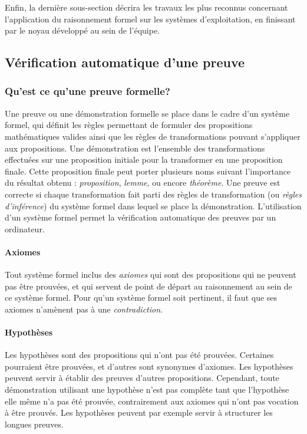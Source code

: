 	Enfin, la dernière sous-section décrira les travaux les plus reconnus concernant l'application du raisonnement formel sur les systèmes d'exploitation, en finissant par le noyau développé au sein de l'équipe.

		\subsection{Vérification automatique d'une preuve}

			\subsubsection{Qu'est ce qu'une preuve formelle?}
			Une preuve ou une démonstration formelle se place dans le cadre d'un système formel, qui définit les règles permettant de formuler des propositions mathématiques valides ainsi que les règles de transformations pouvant s'appliquer aux propositions. Une démonstration est l'ensemble des transformations effectuées sur une proposition initiale pour la transformer en une proposition finale. Cette proposition finale peut porter plusieurs noms suivant l'importance du résultat obtenu : \emph{proposition}, \emph{lemme}, ou encore \emph{théorème}. Une preuve est correcte si chaque transformation fait parti des règles de transformation (ou \emph{règles d'inférence}) du système formel dans lequel se place la démonstration. L'utilisation d'un système formel permet la vérification automatique des preuves par un ordinateur.

			\paragraph{Axiomes} Tout système formel inclus des \emph{axiomes} qui sont des propositions qui ne peuvent pas être prouvées, et qui servent de point de départ au raisonnement au sein de ce système formel. Pour qu'un système formel soit pertinent, il faut que ses axiomes n'amènent pas à une \emph{contradiction}.

			\paragraph{Hypothèses} Les hypothèses sont des propositions qui n'ont pas été prouvées. Certaines pourraient être prouvées, et d'autres sont synonymes d'axiomes. Les hypothèses peuvent servir à établir des preuves d'autres propositions. Cependant, toute démonstration utilisant une hypothèse n'est pas complète tant que l'hypothèse elle même n'a pas été prouvée, contrairement aux axiomes qui n'ont pas vocation à être prouvés. Les hypothèses peuvent par exemple servir à structurer les longues preuves.

